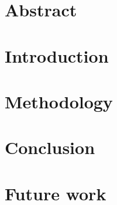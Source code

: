 \documentclass{article}
\begin{document}
    \fi

    \section*{Abstract}

    \section*{Introduction}
    

    \section*{Methodology}
    

    \section*{Conclusion}

    \section*{Future work}\label{sec:futurework}
    
    \newpage
    \printbibliography
\end{document}
